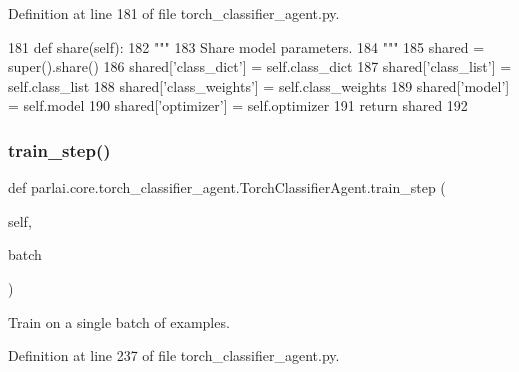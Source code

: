 Definition at line 181 of file torch\+\_\+classifier\+\_\+agent.\+py.


\begin{DoxyCode}
181     \textcolor{keyword}{def }share(self):
182         \textcolor{stringliteral}{"""}
183 \textcolor{stringliteral}{        Share model parameters.}
184 \textcolor{stringliteral}{        """}
185         shared = super().share()
186         shared[\textcolor{stringliteral}{'class\_dict'}] = self.class\_dict
187         shared[\textcolor{stringliteral}{'class\_list'}] = self.class\_list
188         shared[\textcolor{stringliteral}{'class\_weights'}] = self.class\_weights
189         shared[\textcolor{stringliteral}{'model'}] = self.model
190         shared[\textcolor{stringliteral}{'optimizer'}] = self.optimizer
191         \textcolor{keywordflow}{return} shared
192 
\end{DoxyCode}
\mbox{\label{classparlai_1_1core_1_1torch__classifier__agent_1_1TorchClassifierAgent_a3baacdb005c5f5a6367c45c93d21d398}} 
\subsubsection{\texorpdfstring{train\+\_\+step()}{train\_step()}}
{\footnotesize\ttfamily def parlai.\+core.\+torch\+\_\+classifier\+\_\+agent.\+Torch\+Classifier\+Agent.\+train\+\_\+step (\begin{DoxyParamCaption}\item[{}]{self,  }\item[{}]{batch }\end{DoxyParamCaption})}

\begin{DoxyVerb}Train on a single batch of examples.
\end{DoxyVerb}
 

Definition at line 237 of file torch\+\_\+classifier\+\_\+agent.\+py.


